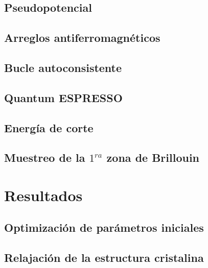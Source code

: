 \documentclass[xcolor=dvipsnames]{beamer}
\begin{document}

\subsection{Pseudopotencial}



\subsection{Arreglos antiferromagn\'eticos}


\subsection{Bucle autoconsistente}


\subsection{Quantum ESPRESSO}


\subsection{Energ\'ia de corte}


\subsection{Muestreo de la $1^{ra}$ zona de Brillouin}


\section{Resultados}

\subsection{Optimizaci\'on de par\'ametros iniciales}


\subsection{Relajaci\'on de la estructura cristalina}

\end{document}
